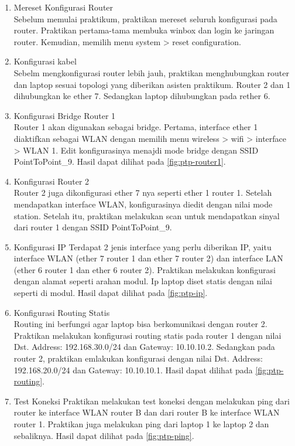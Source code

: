 \begin{enumerate}
  \item Mereset Konfigurasi Router \\
  Sebelum memulai praktikum, praktikan mereset seluruh konfigurasi pada router. Praktikan pertama-tama membuka winbox dan login ke jaringan router. Kemudian, memilih menu system > reset configuration.
  \item Konfigurasi kabel\\
  Sebelm mengkonfigurasi router lebih jauh, praktikan menghubungkan router dan laptop sesuai topologi yang diberikan asisten praktikum. Router 2 dan 1 dihubungkan ke ether 7. Sedangkan laptop dihubungkan pada rether 6. 
  \item Konfigurasi Bridge Router 1\\
  Router 1 akan digunakan sebagai bridge. Pertama, interface ether 1 diaktifkan sebagai WLAN dengan memilih menu wireless > wifi > interface > WLAN 1. Edit konfigurasinya menajdi mode bridge dengan SSID PointToPoint\_9. Hasil dapat dilihat pada \ref{fig:ptp-router1}.
  \item Konfigurasi Router 2 \\
  Router 2 juga dikonfigurasi ether 7 nya seperti ether 1 router 1. Setelah mendapatkan interface WLAN, konfigurasinya diedit dengan nilai mode station. Setelah itu, praktikan melakukan scan untuk mendapatkan sinyal dari router 1 dengan SSID PointToPoint\_9. 
  \item Konfigurasi IP
  Terdapat 2 jenis interface yang perlu diberikan IP, yaitu interface WLAN (ether 7 router 1 dan ether 7 router 2) dan interface LAN (ether 6 router 1 dan ether 6 router 2). Praktikan melakukan konfigurasi dengan alamat seperti arahan modul. Ip laptop diset statis dengan nilai seperti di modul. Hasil dapat dilihat pada \ref{fig:ptp-ip}.
  \item Konfigurasi Routing Statis \\
  Routing ini berfungsi agar laptop bisa berkomunikasi dengan router 2. Praktikan melakukan konfigurasi routing statis pada router 1 dengan nilai Dst. Address: 192.168.30.0/24 dan Gateway: 10.10.10.2. Sedangkan pada router 2, praktikan emlakukan konfigurasi dengan nilai Dst. Address: 192.168.20.0/24 dan Gateway: 10.10.10.1. Hasil dapat dilihat pada \ref{fig:ptp-routing}.
  \item Test Koneksi
  Praktikan melakukan test koneksi dengan melakukan ping dari router ke interface WLAN router B dan dari router B ke interface WLAN router 1. Praktikan juga melakukan ping dari laptop 1 ke laptop 2 dan sebaliknya. Hasil dapat dilihat pada \ref{fig:ptp-ping}.
\end{enumerate}

